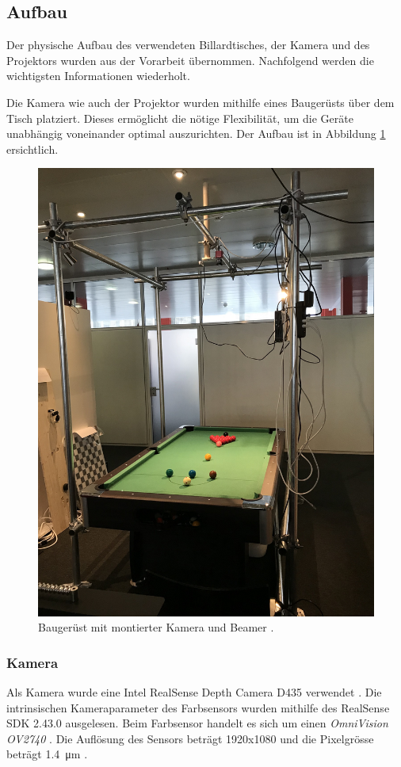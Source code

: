 \subsection{Aufbau}
Der physische Aufbau des verwendeten Billardtisches, der Kamera und des Projektors wurden aus der Vorarbeit \cite{project2:aufbau} übernommen.
Nachfolgend werden die wichtigsten Informationen wiederholt.

Die Kamera wie auch der Projektor wurden mithilfe eines Baugerüsts über dem Tisch platziert.
Dieses ermöglicht die nötige Flexibilität, um die Geräte unabhängig voneinander optimal auszurichten.
Der Aufbau ist in Abbildung \ref{fig:construction} ersichtlich.

\begin{figure}[h!]
    \begin{center}
        \includegraphics[width=0.6\linewidth]{../common/03_billiard_ai/resources/table.jpg}
    \end{center}
    \caption{Baugerüst mit montierter Kamera und Beamer \cite{project2:aufbau}.}
    \label{fig:construction}
\end{figure}

\subsubsection{Kamera}\label{kap:camera}

Als Kamera wurde eine Intel RealSense Depth Camera D435 verwendet \cite{intel:realsense_d435}.
Die intrinsischen Kameraparameter des Farbsensors wurden mithilfe des RealSense SDK 2.43.0 \cite{github:realsense_sdk} ausgelesen.
Beim Farbsensor handelt es sich um einen \emph{OmniVision OV2740} \cite{intel:realsense_d435_datasheet}.
Die Auflösung des Sensors beträgt 1920x1080 und die Pixelgrösse beträgt \SI{1.4}{\micro\metre} \cite{omnivision:ov2740}.

